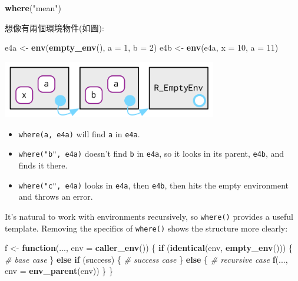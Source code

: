 \documentclass[]{book}
\newenvironment{Shaded}{\begin{snugshade}}{\end{snugshade}}
\newcommand{\CommentTok}[1]{\textcolor[rgb]{0.56,0.35,0.01}{\textit{#1}}}
\newcommand{\ControlFlowTok}[1]{\textcolor[rgb]{0.13,0.29,0.53}{\textbf{#1}}}
\newcommand{\DataTypeTok}[1]{\textcolor[rgb]{0.13,0.29,0.53}{#1}}
\newcommand{\DecValTok}[1]{\textcolor[rgb]{0.00,0.00,0.81}{#1}}
\newcommand{\KeywordTok}[1]{\textcolor[rgb]{0.13,0.29,0.53}{\textbf{#1}}}
\newcommand{\NormalTok}[1]{#1}
\newcommand{\StringTok}[1]{\textcolor[rgb]{0.31,0.60,0.02}{#1}}
\theoremstyle{definition}
\theoremstyle{definition}
\theoremstyle{definition}
\theoremstyle{remark}
\begin{document}
\begin{Shaded}
\begin{Highlighting}[]
\KeywordTok{where}\NormalTok{(}\StringTok{"mean"}\NormalTok{)}
\end{Highlighting}
\end{Shaded}

想像有兩個環境物件(如圖):

\begin{Shaded}
\begin{Highlighting}[]
\NormalTok{e4a <-}\StringTok{ }\KeywordTok{env}\NormalTok{(}\KeywordTok{empty_env}\NormalTok{(), }\DataTypeTok{a =} \DecValTok{1}\NormalTok{, }\DataTypeTok{b =} \DecValTok{2}\NormalTok{)}
\NormalTok{e4b <-}\StringTok{ }\KeywordTok{env}\NormalTok{(e4a, }\DataTypeTok{x =} \DecValTok{10}\NormalTok{, }\DataTypeTok{a =} \DecValTok{11}\NormalTok{)}
\end{Highlighting}
\end{Shaded}

\begin{center}\includegraphics[width=3.69in]{diagrams/environments/where-ex} \end{center}

\begin{itemize}
\item
  \texttt{where(a,\ e4a)} will find \texttt{a} in \texttt{e4a}.
\item
  \texttt{where("b",\ e4a)} doesn't find \texttt{b} in \texttt{e4a}, so
  it looks in its parent, \texttt{e4b}, and finds it there.
\item
  \texttt{where("c",\ e4a)} looks in \texttt{e4a}, then \texttt{e4b},
  then hits the empty environment and throws an error.
\end{itemize}

It's natural to work with environments recursively, so \texttt{where()}
provides a useful template. Removing the specifics of \texttt{where()}
shows the structure more clearly:

\begin{Shaded}
\begin{Highlighting}[]
\NormalTok{f <-}\StringTok{ }\ControlFlowTok{function}\NormalTok{(..., }\DataTypeTok{env =} \KeywordTok{caller_env}\NormalTok{()) \{}
  \ControlFlowTok{if}\NormalTok{ (}\KeywordTok{identical}\NormalTok{(env, }\KeywordTok{empty_env}\NormalTok{())) \{}
    \CommentTok{# base case}
\NormalTok{  \} }\ControlFlowTok{else} \ControlFlowTok{if}\NormalTok{ (success) \{}
    \CommentTok{# success case}
\NormalTok{  \} }\ControlFlowTok{else}\NormalTok{ \{}
    \CommentTok{# recursive case}
    \KeywordTok{f}\NormalTok{(..., }\DataTypeTok{env =} \KeywordTok{env_parent}\NormalTok{(env))}
\NormalTok{  \}}
\NormalTok{\}}
\end{Highlighting}
\end{Shaded}
\end{document}
